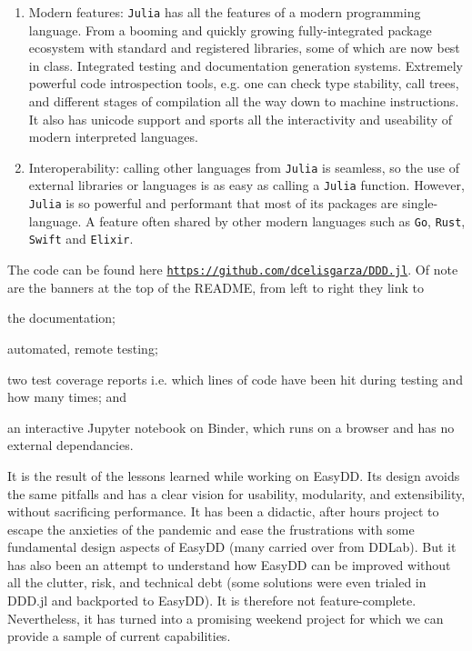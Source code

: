 \begin{enumerate}
    \item Modern features: \texttt{Julia} has all the features of a modern programming language. From a booming and quickly growing fully-integrated package ecosystem with standard and registered libraries, some of which are now best in class. Integrated testing and documentation generation systems. Extremely powerful code introspection tools, e.g. one can check type stability, call trees, and different stages of compilation all the way down to machine instructions. It also has unicode support and sports all the interactivity and useability of modern interpreted languages.
    \item Interoperability: calling other languages from \texttt{Julia} is seamless, so the use of external libraries or languages is as easy as calling a \texttt{Julia} function. However, \texttt{Julia} is so powerful and performant that most of its packages are single-language. A feature often shared by other modern languages such as \texttt{Go}, \texttt{Rust}, \texttt{Swift} and \texttt{Elixir}.
\end{enumerate}

The code can be found here \href{https://github.com/dcelisgarza/DDD.jl}{\texttt{https://github.com/dcelisgarza/DDD.jl}}. Of note are the banners at the top of the README, from left to right they link to
\begin{inparaenum}
    \item the documentation;
    \item automated, remote testing;
    \item two test coverage reports i.e. which lines of code have been hit during testing and how many times; and
    \item an interactive Jupyter notebook on Binder, which runs on a browser and has no external dependancies.
\end{inparaenum}

It is the result of the lessons learned while working on EasyDD. Its design avoids the same pitfalls and has a clear vision for usability, modularity, and extensibility, without sacrificing performance. It has been a didactic, after hours project to escape the anxieties of the pandemic and ease the frustrations with some fundamental design aspects of EasyDD (many carried over from DDLab). But it has also been an attempt to understand how EasyDD can be improved without all the clutter, risk, and technical debt (some solutions were even trialed in DDD.jl and backported to EasyDD). It is therefore not feature-complete. Nevertheless, it has turned into a promising weekend project for which we can provide a sample of current capabilities.

